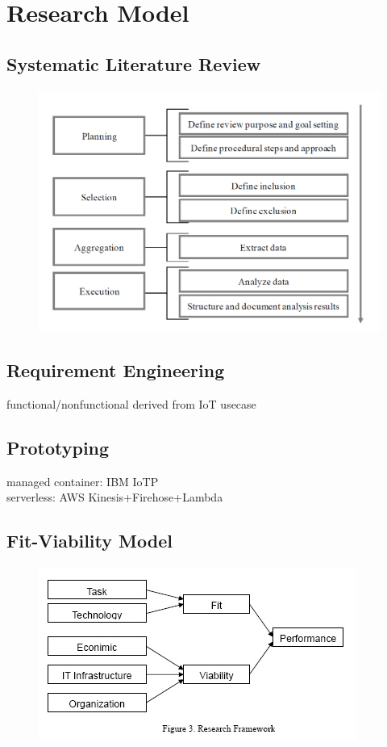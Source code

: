\section{Research Model}

\subsection{Systematic Literature Review}

\begin{figure}[ht]
    \includegraphics[width=0.8\linewidth]{images/methodology/litSearc.png}\centering
    \caption{\cite{Okoli2010AResearch}}
\end{figure}


\subsection{Requirement Engineering}

functional/nonfunctional derived from IoT usecase


\subsection{Prototyping}

managed container: IBM IoTP\\
serverless: AWS Kinesis+Firehose+Lambda


\subsection{Fit-Viability Model}

\begin{figure}[ht]
    \includegraphics[width=0.7\linewidth]{images/methodology/fvm.jpg}\centering
    \caption{\cite{Liang2007AdoptionModel}}
\end{figure}


